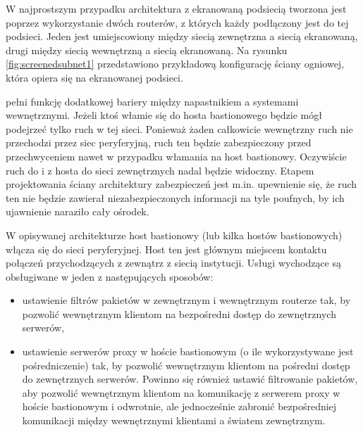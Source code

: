 W najprostszym przypadku architektura z ekranowaną podsiecią tworzona jest
poprzez wykorzystanie dwóch routerów, z których każdy podłączony jest do tej
podsieci. Jeden jest umiejscowiony między siecią zewnętrzna a siecią
ekranowaną, drugi między siecią wewnętrzną a siecią ekranowaną. Na rysunku
\ref{fig:screenedsubnet1} przedstawiono przykładową konfigurację ściany
ogniowej, która opiera się na ekranowanej podsieci.

\begin{figure*}
\begin{center}

\end{center}
\caption[Architektura ekranowanej podsieci z wykorzystaniem dwóch routerów]
{\label{fig:screenedsubnet1} Architektura ekranowanej podsieci z
wykorzystaniem dwóch routerów.}
\end{figure*}

 pełni funkcję dodatkowej bariery między napastnikiem a
systemami wewnętrznymi. Jeżeli ktoś włamie się do hosta bastionowego będzie
mógł podejrzeć tylko ruch w tej sieci. Ponieważ żaden całkowicie wewnętrzny
ruch nie przechodzi przez siec peryferyjną, ruch ten będzie zabezpieczony
przed przechwyceniem nawet w przypadku włamania na host bastionowy.
Oczywiście ruch do i z hosta do sieci zewnętrznych nadal będzie widoczny.
Etapem projektowania ściany architektury zabezpieczeń jest m.in. upewnienie
się, że ruch ten nie będzie zawierał niezabezpieczonych informacji na tyle
poufnych, by ich ujawnienie naraziło cały ośrodek.

W opisywanej architekturze host bastionowy (lub kilka hostów bastionowych)
włącza się do sieci peryferyjnej. Host ten jest głównym miejscem kontaktu
połączeń przychodzących z zewnątrz z siecią instytucji. Usługi wychodzące są
obsługiwane w jeden z następujących sposobów:

\begin{itemize}

\item ustawienie filtrów pakietów w zewnętrznym i wewnętrznym routerze tak,
by pozwolić wewnętrznym klientom na bezpośredni dostęp do zewnętrznych
serwerów,

\item ustawienie serwerów proxy w hoście bastionowym (o ile wykorzystywane
jest pośredniczenie) tak, by pozwolić wewnętrznym klientom na pośredni
dostęp do zewnętrznych serwerów. Powinno się również ustawić filtrowanie
pakietów, aby pozwolić wewnętrznym klientom na komunikację z serwerem proxy
w hoście bastionowym i odwrotnie, ale jednocześnie zabronić bezpośredniej
komunikacji między wewnętrznymi klientami a światem zewnętrznym.

\end{itemize}

